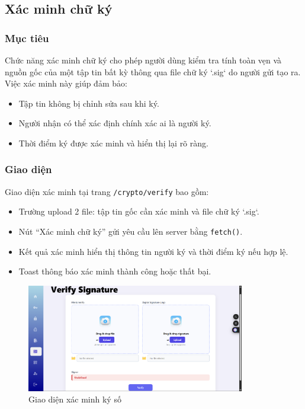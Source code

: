 \newpage
\subsection{Xác minh chữ ký}

\subsubsection*{Mục tiêu}
Chức năng xác minh chữ ký cho phép người dùng kiểm tra tính toàn vẹn và nguồn gốc của một tập tin bất kỳ thông qua file chữ ký `.sig` do người gửi tạo ra. Việc xác minh này giúp đảm bảo:
\begin{itemize}
    \item Tập tin không bị chỉnh sửa sau khi ký.
    \item Người nhận có thể xác định chính xác ai là người ký.
    \item Thời điểm ký được xác minh và hiển thị lại rõ ràng.
\end{itemize}

\subsubsection*{Giao diện}
Giao diện xác minh tại trang \texttt{/crypto/verify} bao gồm:
\begin{itemize}
    \item Trường upload 2 file: tập tin gốc cần xác minh và file chữ ký `.sig`.
    \item Nút “Xác minh chữ ký” gửi yêu cầu lên server bằng \texttt{fetch()}.
    \item Kết quả xác minh hiển thị thông tin người ký và thời điểm ký nếu hợp lệ.
    \item Toast thông báo xác minh thành công hoặc thất bại.
\end{itemize}

\begin{figure}[H]
    \centering
    \includegraphics[width=0.85\textwidth]{img/9_verify/9_verify_form.png}
    \caption{Giao diện xác minh ký số}
\end{figure}

